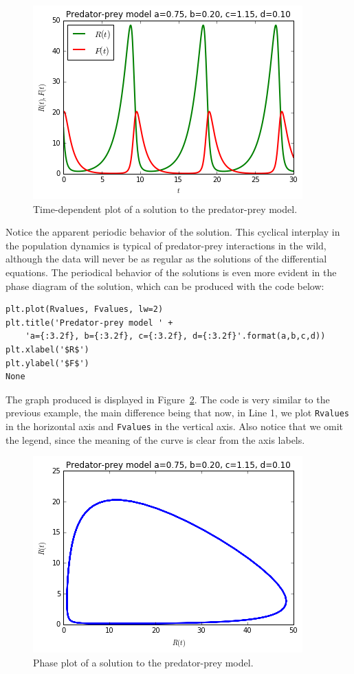 \begin{figure}[h]
\caption{Time-dependent plot of a solution to the predator-prey model.}
\label{fig-predprey-timedep}
\begin{center}
\includegraphics[scale=0.6]{predprey-timedep.png}
\end{center}
\end{figure}

Notice the apparent periodic behavior of the solution. This cyclical interplay in the population dynamics is typical of predator-prey interactions in the wild, although the data will never be as regular as the solutions of the differential equations. The periodical behavior of the solutions is even more evident in the phase diagram of the solution, which can be produced with the code below:
\begin{lstlisting}
plt.plot(Rvalues, Fvalues, lw=2)
plt.title('Predator-prey model ' + 
    'a={:3.2f}, b={:3.2f}, c={:3.2f}, d={:3.2f}'.format(a,b,c,d))
plt.xlabel('$R$')
plt.ylabel('$F$')
None
\end{lstlisting}
The graph produced is displayed in Figure~\ref{fig-predprey-phase1}. The code is very similar to the previous example, the main difference being that now, in Line 1, we plot \texttt{Rvalues} in the horizontal axis and \texttt{Fvalues} in the vertical axis. Also notice that we omit the legend, since the meaning of the curve is clear from the axis labels.

\begin{figure}[h]
\caption{Phase plot of a solution to the predator-prey model.}
\label{fig-predprey-phase1}
\begin{center}
\includegraphics[scale=0.6]{predprey-phase1}
\end{center}
\end{figure}


